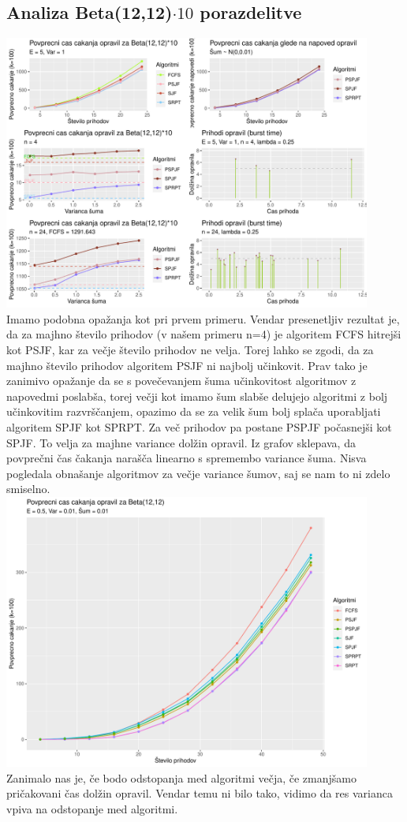 \documentclass[a4paper, pt14]{article}
\begin{document}
\subsection{Analiza Beta(12,12)$\cdot 10$ porazdelitve}
\includegraphics[width=12.1cm,keepaspectratio]{Beta_grafi.pdf}
\\ Imamo podobna opažanja kot pri prvem primeru. Vendar presenetljiv rezultat je, da za majhno število prihodov (v našem primeru n=4) je algoritem FCFS hitrejši kot PSJF, kar za večje število prihodov ne velja. Torej lahko se zgodi, da za majhno število prihodov algoritem PSJF ni najbolj učinkovit. Prav tako je zanimivo opažanje da se s povečevanjem šuma  učinkovitost algoritmov z napovedmi poslabša, torej večji kot imamo šum slabše delujejo algoritmi z bolj učinkovitim razvrščanjem, opazimo da se za velik šum bolj splača uporabljati algoritem SPJF kot SPRPT. Za več prihodov pa postane PSPJF počasnejši kot SPJF. To velja za majhne variance dolžin opravil. Iz grafov sklepava, da povprečni čas čakanja narašča linearno s spremembo variance šuma. Nisva pogledala obnašanje algoritmov za večje variance šumov, saj se nam to ni zdelo smiselno.\\
\includegraphics[width=12.1cm,keepaspectratio]{Beta_grafi_majhna.pdf}
\\
Zanimalo nas je, če bodo odstopanja med algoritmi večja, če zmanjšamo pričakovani čas dolžin opravil. Vendar temu ni bilo tako, vidimo da res varianca vpiva na odstopanje med algoritmi. 
\end{document}
